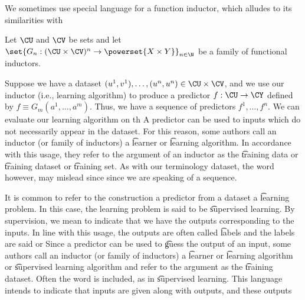 
We sometimes use special language for a function inductor, which alludes to its similarities with 


Let $\CU$ and $\CV$ be sets and let $\set{G_n: (\CU \times \CV)^n \to \powerset{X \times Y}}_{n \in \N}$ be a family of functional inductors.

Suppose we have a dataset $(u^1, v^1), \dots, (u^n, u^n) \in \CU \times \CV$, and we use our inductor (i.e., learning algorithm) to produce a predictor $f: \CU \to \CY$ defined by $f \equiv G_m(a^1, \dots, a^m)$.
Thus, we have a sequence of predictors $f^1, \dots, f^n$.
We can evaluate our learning algorithm on th
A predictor can be used to  inputs which do not necessarily appear in the dataset.
For this reason, some authors call an inductor (or family of inductors) a \t{learner} or \t{learning algorithm}.
In accordance with this usage, they refer to the argument of an inductor as the \t{training data} or \t{training dataset} or \t{training set}.
As with our terminology dataset, the word  however, may mislead since since we are speaking of a sequence.

It is common to refer to the construction a predictor from a dataset a \t{learning problem}.
In this case, the learning problem is said to be \t{supervised learning}.
By supervision, we mean to indicate that we have the outputs corresponding to the inputs.
In line with this usage, the outputs are often called \t{labels} and the labels are said  or 
Since a predictor can be used to \t{guess} the output of an input, some authors call an inductor (or family of inductors) a \t{learner} or \t{learning algorithm} or \t{supervised learning algorithm} and refer to the argument as the \t{training dataset}.
Often the word  is included, as in \t{supervised learning}.
This language intends to indicate that inputs are given along with outputs, and these outputs 

\blankpage

